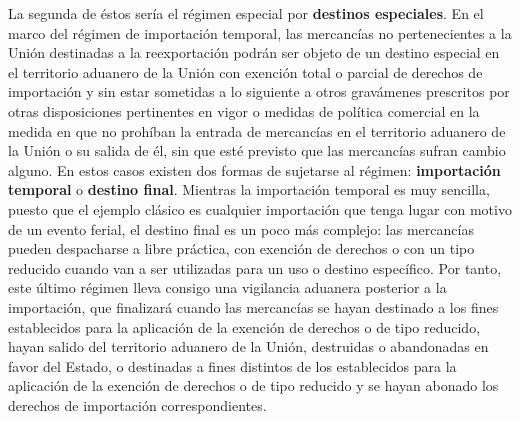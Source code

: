 \documentclass[10pt,a4paper]{article}
\begin{document}
La segunda de éstos sería el régimen especial por \textbf{destinos especiales}. En el marco del régimen de importación temporal, las mercancías no pertenecientes a la Unión destinadas a la reexportación podrán ser objeto de un destino especial en el territorio aduanero de la Unión con exención total o parcial de derechos de importación y sin estar sometidas a lo siguiente a otros gravámenes prescritos por otras disposiciones pertinentes en vigor o medidas de política comercial en la medida en que no prohíban la entrada de mercancías en el territorio aduanero de la Unión o su salida de él, sin que esté previsto que las mercancías sufran cambio alguno. En estos casos existen dos formas de sujetarse al régimen: \textbf{importación temporal} o \textbf{destino final}. Mientras la importación temporal es muy sencilla, puesto que el ejemplo clásico es cualquier importación que tenga lugar con motivo de un evento ferial, el destino final es un poco más complejo: las mercancías pueden despacharse a libre práctica, con exención de derechos o con un tipo reducido cuando van a ser utilizadas para un uso o destino específico. Por tanto, este último régimen lleva consigo una vigilancia aduanera posterior a la importación, que finalizará cuando las mercancías se hayan destinado a los fines establecidos para la aplicación de la exención de derechos o de tipo reducido, hayan salido del territorio aduanero de la Unión, destruidas o abandonadas en favor del Estado, o destinadas a fines distintos de los establecidos para la aplicación de la exención de derechos o de tipo reducido y se hayan abonado los derechos de importación correspondientes. 
\end{document}
